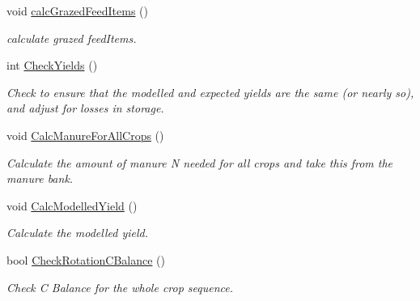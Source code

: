 \begin{DoxyCompactItemize}
\mbox{\label{class_crop_sequence_class_a1274090ce08e244b75f7e0475c53201f}} 
void \mbox{\hyperlink{class_crop_sequence_class_a1274090ce08e244b75f7e0475c53201f}{calc\+Grazed\+Feed\+Items}} ()
\begin{DoxyCompactList}\small\item\em calculate grazed feed\+Items. \end{DoxyCompactList}\item 
\mbox{\label{class_crop_sequence_class_a9367b587026218a44ff1806988f3ee65}} 
int \mbox{\hyperlink{class_crop_sequence_class_a9367b587026218a44ff1806988f3ee65}{Check\+Yields}} ()
\begin{DoxyCompactList}\small\item\em Check to ensure that the modelled and expected yields are the same (or nearly so), and adjust for losses in storage. \end{DoxyCompactList}\item 
\mbox{\label{class_crop_sequence_class_a907b438fe2a9d3ada68b32472492f81d}} 
void \mbox{\hyperlink{class_crop_sequence_class_a907b438fe2a9d3ada68b32472492f81d}{Calc\+Manure\+For\+All\+Crops}} ()
\begin{DoxyCompactList}\small\item\em Calculate the amount of manure N needed for all crops and take this from the manure bank. \end{DoxyCompactList}\item 
\mbox{\label{class_crop_sequence_class_aeda543e18a2c235b31d36a41130f17e7}} 
void \mbox{\hyperlink{class_crop_sequence_class_aeda543e18a2c235b31d36a41130f17e7}{Calc\+Modelled\+Yield}} ()
\begin{DoxyCompactList}\small\item\em Calculate the modelled yield. \end{DoxyCompactList}\item 
\mbox{\label{class_crop_sequence_class_acf5cb20fa20f54ab86094e0f1bcdf07d}} 
bool \mbox{\hyperlink{class_crop_sequence_class_acf5cb20fa20f54ab86094e0f1bcdf07d}{Check\+Rotation\+C\+Balance}} ()
\begin{DoxyCompactList}\small\item\em Check C Balance for the whole crop sequence. \end{DoxyCompactList}\item 

\end{DoxyCompactItemize}
